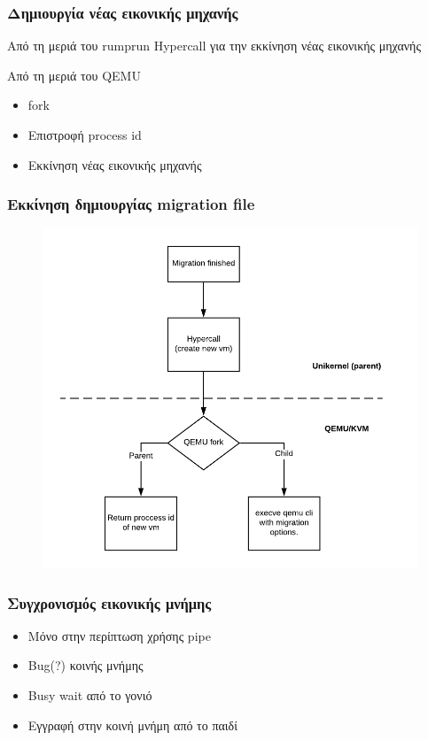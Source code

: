\documentclass[red,slidestop,notes,compress,mathserif]{beamer}
\begin{document}
\begin{frame}
\frametitle{Δημιουργία νέας εικονικής μηχανής}
\begin{block}{Από τη μεριά του rumprun}
Hypercall για την εκκίνηση νέας εικονικής μηχανής
\end{block}
\begin{block}{Από τη μεριά του QEMU}
\begin{itemize}
\item fork 
\item Επιστροφή process id 
\item Εκκίνηση νέας εικονικής μηχανής 
\end{itemize}
\end{block}
\end{frame}

\begin{frame}
\frametitle{Εκκίνηση δημιουργίας migration file}
\begin{figure}
\center
\includegraphics[scale=0.57]{figures/fork_stage2.png}
\end{figure}
\end{frame}

\begin{frame}
\frametitle{Συγχρονισμός εικονικής μνήμης}
\begin{itemize}
\item Μόνο στην περίπτωση χρήσης pipe
\item Bug(?) κοινής μνήμης
\item Busy wait από το γονιό
\item Εγγραφή στην κοινή μνήμη από το παιδί
\end{itemize}
\end{frame}
\end{document}
